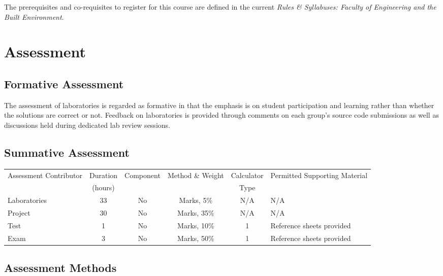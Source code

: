 \documentclass[11pt]{eie-cbo}
\begin{document}
The prerequisites and co-requisites to register for this course are defined in the current \emph{Rules \& Syllabuses: Faculty of Engineering and the Built Environment}.

\section{Assessment}\label{assessment}

\subsection{Formative Assessment}\label{formative}
The assessment of laboratories is regarded as formative in that the emphasis is on student participation and learning rather than whether the solutions are correct or not. Feedback on laboratories is provided through comments on each group's source code submissions as well as discussions held during dedicated lab review sessions.

\pagebreak
\subsection{Summative Assessment}\label{summative}
\begin{table}[ht]\small\centering
\begin{tabular}{lccccl}\toprule
\multirow{2}{2cm}{Assessment Contributor}  & Duration & Component & \multirow{2}{1.5cm}{Method \& Weight} & Calculator & \multirow{2}{3.5cm}{Permitted Supporting Material}\\ 
 & (hours) & & & Type &  \\
\midrule
Laboratories & 33  & No & Marks, 5\% & N/A & N/A  \\
Project & 30  & No & Marks, 35\% & N/A & N/A  \\
Test & 1  & No & Marks, 10\% & 1 & Reference sheets provided  \\
Exam & 3  & No & Marks, 50\% & 1 & Reference sheets provided  \\
\bottomrule
\end{tabular}\label{tab:sum-contributors}
\end{table}

\subsection{Assessment Methods}\label{methods}
\end{document}
